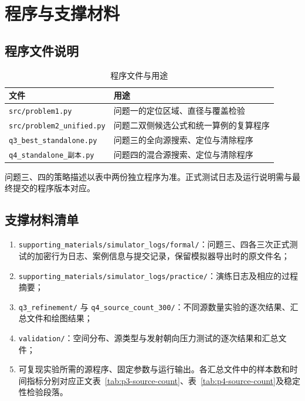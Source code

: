 \section{程序与支撑材料}

\subsection{程序文件说明}
\begin{table}[H]
  \centering
  \caption{程序文件与用途}
  \begin{tabularx}{\textwidth}{p{}X}
    \toprule
    文件 & 用途 \\
    \midrule
    \texttt{src/problem1.py} & 问题一的定位区域、直径与覆盖检验 \\
    \texttt{src/problem2\_unified.py} & 问题二双侧候选公式和统一算例的复算程序 \\
    \texttt{q3\_best\_standalone.py} & 问题三的全向源搜索、定位与清除程序 \\
    \texttt{q4\_standalone\_副本.py} & 问题四的混合源搜索、定位与清除程序 \\
    \bottomrule
  \end{tabularx}
\end{table}

问题三、四的策略描述以表中两份独立程序为准。正式测试日志及运行说明需与最终提交的程序版本对应。

\subsection{支撑材料清单}
\begin{enumerate}
  \item \texttt{supporting\_materials/simulator\_logs/formal/}：问题三、四各三次正式测试的加密行为日志、案例信息与提交记录，保留模拟器导出时的原文件名；
  \item \texttt{supporting\_materials/simulator\_logs/practice/}：演练日志及相应的过程摘要；
  \item \texttt{q3\_refinement/} 与 \texttt{q4\_source\_count\_300/}：不同源数量实验的逐次结果、汇总文件和绘图结果；
  \item \texttt{validation/}：空间分布、源类型与发射朝向压力测试的逐次结果和汇总文件；
  \item 可复现实验所需的源程序、固定参数与运行输出。各汇总文件中的样本数和时间指标分别对应正文表~\ref{tab:p3-source-count}、表~\ref{tab:p4-source-count}及稳定性检验段落。
\end{enumerate}
